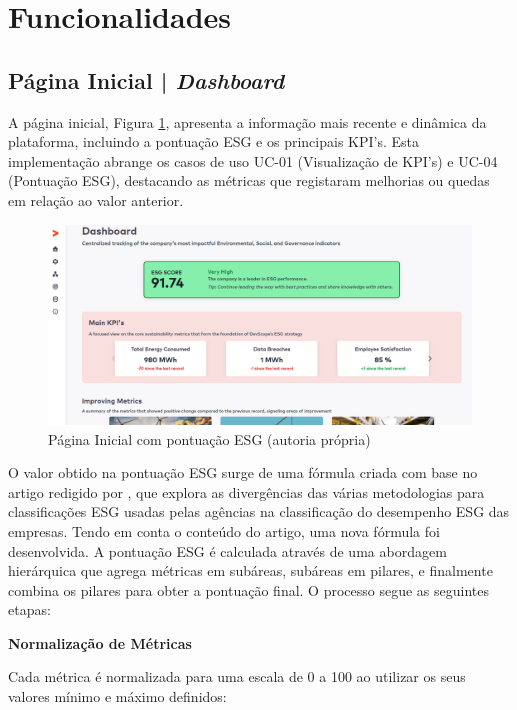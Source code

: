 \section{Funcionalidades}

\subsection{Página Inicial | \textit{Dashboard}}

A página inicial, Figura \ref{fig:homepage}, apresenta a informação mais recente e dinâmica da plataforma, incluindo a pontuação ESG e os principais KPI's. Esta implementação abrange os casos de uso UC-01 (Visualização de KPI's) e UC-04 (Pontuação ESG), destacando as métricas que registaram melhorias ou quedas em relação ao valor anterior.

\begin{figure}[H]
    \centering
    \includegraphics[width=\linewidth,keepaspectratio]{frontmatter/assets/platform_prints/dashboard/dashboard_done.png}
    \caption{Página Inicial com pontuação ESG (autoria própria)}
    \label{fig:homepage}
\end{figure}

O valor obtido na pontuação ESG surge de uma fórmula criada com base no artigo redigido por \cite{Berg2022}, que explora as divergências das várias metodologias para classificações ESG usadas pelas agências na classificação do desempenho ESG das empresas. Tendo em conta o conteúdo do artigo, uma nova fórmula foi desenvolvida. A pontuação ESG é calculada através de uma abordagem hierárquica que agrega métricas em subáreas, subáreas em pilares, e finalmente combina os pilares para obter a pontuação final. O processo segue as seguintes etapas:


\textbf{Normalização de Métricas}

Cada métrica é normalizada para uma escala de 0 a 100 ao utilizar os seus valores mínimo e máximo definidos:

